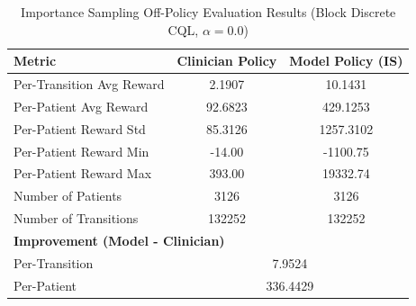 \begin{table}[h]
\centering
\caption{Importance Sampling Off-Policy Evaluation Results (Block Discrete CQL, $\alpha=0.0$)}
\label{tab:is_ope_results}
\begin{tabular}{lcc}
\hline
\textbf{Metric} & \textbf{Clinician Policy} & \textbf{Model Policy (IS)} \\
\hline
Per-Transition Avg Reward & 2.1907 & 10.1431 \\
Per-Patient Avg Reward & 92.6823 & 429.1253 \\
\hline
Per-Patient Reward Std & 85.3126 & 1257.3102 \\
Per-Patient Reward Min & -14.00 & -1100.75 \\
Per-Patient Reward Max & 393.00 & 19332.74 \\
\hline
Number of Patients & 3126 & 3126 \\
Number of Transitions & 132252 & 132252 \\
\hline
\multicolumn{3}{l}{\textbf{Improvement (Model - Clinician)}} \\
\hline
Per-Transition & \multicolumn{2}{c}{7.9524} \\
Per-Patient & \multicolumn{2}{c}{336.4429} \\
\hline
\end{tabular}
\end{table}

